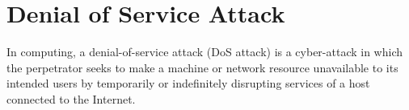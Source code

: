 \section{Denial of Service Attack}
In computing, a denial-of-service attack (DoS attack) is a cyber-attack in which the perpetrator seeks to make a machine or network resource unavailable to its intended users by temporarily or indefinitely disrupting services of a host connected to the Internet\cite{dos}. 


